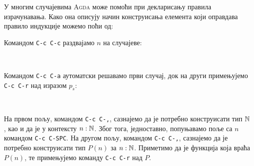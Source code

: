 У многим случајевима \textsc{Agda} може помоћи при декларисању правила израчунавања. Како она описују начин конструисања елемента који оправдава правило индукције можемо поћи од:
\begin{code}%
\>[0]\AgdaSpace{}%
\AgdaSpace{}%
\AgdaSpace{}%
\AgdaSpace{}%
\AgdaSpace{}%
\AgdaSymbol{=}\AgdaSpace{}%
\AgdaHole{\{!\ \ \ !\}}\<%
\end{code}
Командом \texttt{C-c C-c} раздвајамо $n$ на случајеве:
\begin{code}%
\>[0]\AgdaSpace{}%
\AgdaSpace{}%
\AgdaSpace{}%
\AgdaSpace{}%
%
\>[29]\AgdaSymbol{=}\AgdaSpace{}%
\AgdaHole{\{!\ \ \ !\}}\<%
\\
\>[0]\AgdaSpace{}%
\AgdaSpace{}%
\AgdaSpace{}%
\AgdaSpace{}%
\AgdaSymbol{(}\AgdaSpace{}%
\AgdaSymbol{)}\AgdaSpace{}%
\AgdaSymbol{=}\AgdaSpace{}%
\AgdaHole{\{!\ \ \ !\}}\<%
\end{code}
Командом \texttt{C-c C-а} аутоматски решавамо први случај, док на други примењујемо \texttt{C-c C-r} над изразом $p_s$:
\begin{code}%
\>[0]\AgdaSpace{}%
\AgdaSpace{}%
\AgdaSpace{}%
\AgdaSpace{}%
%
\>[29]\AgdaSymbol{=}\AgdaSpace{}%
\<%
\\
\>[0]\AgdaSpace{}%
\AgdaSpace{}%
\AgdaSpace{}%
\AgdaSpace{}%
\AgdaSymbol{(}\AgdaSpace{}%
\AgdaSymbol{)}\AgdaSpace{}%
\AgdaSymbol{=}\AgdaSpace{}%
\AgdaSpace{}%
\AgdaHole{\{!\ \ \ !\}}\AgdaSpace{}%
\AgdaHole{\{!\ \ \ !\}}\<%
\end{code}
На првом пољу, командом \texttt{C-c C-,}, сазнајемо да је потребно конструисати тип ${\mathbb{N}}$, као и да је у контексту $n : {\mathbb{N}}$. Због тога, једноставно, попуњавамо поље са $n$ командом \texttt{C-c C-SPC}. На другом пољу, командом \texttt{C-c C-,}, сазнајемо да је потребно конструисати тип $P(n)$ за $n : {\mathbb{N}}$. Приметимо да је  функција која враћа $P(n)$, те примењујемо команду \texttt{C-c C-r} над  $P$.
\begin{code}%
\>[0]\AgdaSpace{}%
\AgdaSpace{}%
\AgdaSpace{}%
\AgdaSpace{}%
%
\>[29]\AgdaSymbol{=}\AgdaSpace{}%
\<%
\\
\>[0]\AgdaSpace{}%
\AgdaSpace{}%
\AgdaSpace{}%
\AgdaSpace{}%
\AgdaSymbol{(}\AgdaSpace{}%
\AgdaSymbol{)}\AgdaSpace{}%
\AgdaSymbol{=}\AgdaSpace{}%
\AgdaSpace{}%
\AgdaSpace{}%
\AgdaSymbol{(}\AgdaSpace{}%
\AgdaSpace{}%
\AgdaHole{\{!\ \ \ !\}}\AgdaSpace{}%
\AgdaHole{\{!\ \ \ !\}}\AgdaSpace{}%
\AgdaHole{\{!\ \ \ !\}}\AgdaSymbol{)}\<%
\end{code}

